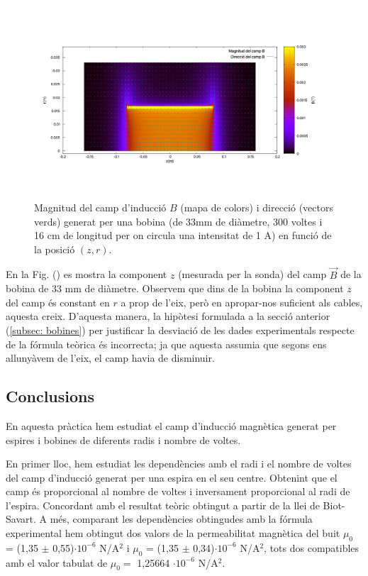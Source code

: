 \documentclass[11pt]{article}
\numberwithin{equation}{section}
\numberwithin{figure}{section}
\numberwithin{table}{section}
\begin{document}
\begin{figure}[H]
    \centering
    \includegraphics[width=0.75\linewidth]{res.png}
    \caption{Magnitud del camp d'inducció $B$ (mapa de colors) i direcció (vectors verds) generat per una bobina (de 33mm de diàmetre, 300 voltes i 16 cm de longitud per on circula una intensitat de 1 A) en funció de la posició $(z,r)$.}
    \label{fig: Bprog}
\end{figure}

En la Fig. () es mostra la component $z$ (mesurada per la sonda) del camp $\vec{B}$ de la bobina de 33 mm de diàmetre. Observem que dins de la bobina la component $z$ del camp és constant en $r$ a prop de l'eix, però en apropar-nos suficient als cables, aquesta creix. D'aquesta manera, la hipòtesi formulada a la secció anterior (\ref{subsec: bobines}) per justificar la desviació de les dades experimentals respecte de la fórmula teòrica és incorrecta; ja que aquesta assumia que segons ens allunyàvem de l'eix, el camp havia de disminuir.

\subsection{Conclusions}\label{sec: conclusions}
En aquesta pràctica hem estudiat el camp d'inducció magnètica generat per espires i bobines de diferents radis i nombre de voltes. 

En primer lloc, hem estudiat les dependències amb el radi i el nombre de voltes del camp d'inducció generat per una espira en el seu centre. Obtenint que el camp és proporcional al nombre de voltes i inversament proporcional al radi de l'espira. Concordant amb el resultat teòric obtingut a partir de la llei de Biot-Savart. A més, comparant les dependències obtingudes amb la fórmula experimental hem obtingut dos valors de la permeabilitat magnètica del buit $\mu_0$ = (1,35 $\pm$ 0,55)$\cdot10^{-6}$ N/A$^2$ i $\mu_0$ = (1,35 $\pm$ 0,34)$\cdot10^{-6}$ N/A$^2$, tots dos compatibles amb el valor tabulat de $\mu_0 =$  1,25664 $\cdot 10^{-6}$ N/A$^2$.
\end{document}
